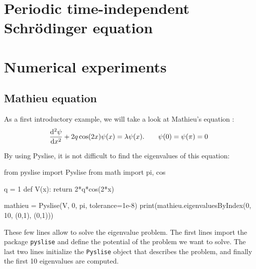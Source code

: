 \cite{baeyens_fast_2020}

\section{Periodic \texorpdfstring{\oneD}{1D} time-independent Schrödinger equation}
\label{sec:1d_periodic}

\begin{theorem}

\end{theorem}
\cite{binding_prufer_2012}


\section{Numerical experiments}\label{sec:c2_numerical_experiments}

\subsection{Mathieu equation}\label{mathieu-equation}

As a first introductory example, we will take a look at Mathieu's
equation \cite{pryce_sltstpak_1999}: \begin{equation}
  \dv[2]{\psi}{x} + 2q\cos(2x)\psi(x) = \lambda\psi(x) \text{.}  \qquad \psi(0) = \psi(\pi) = 0
  \label{mathieu}
\end{equation}

By using Pyslise, it is not difficult to find the eigenvalues of this
equation:

\begin{python}
  from pyslise import Pyslise
  from math import pi, cos
  
  q = 1
  def V(x):
    return 2*q*cos(2*x)
  
  mathieu = Pyslise(V, 0, pi, tolerance=1e-8)
  print(mathieu.eigenvaluesByIndex(0, 10, (0,1), (0,1)))
\end{python}

These few lines allow to solve the eigenvalue problem. The first
lines import the package \texttt{pyslise} and define the potential of the problem we want to
solve. The last two lines initialize the \texttt{Pyslise} object that
describes the problem, and finally the first 10 eigenvalues are
computed.

